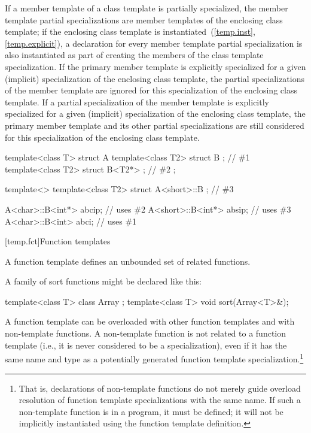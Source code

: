 \pnum
If a member template of a class template is partially specialized,
the member template partial specializations are member templates of
the enclosing class template;
if the enclosing class template is instantiated~(\ref{temp.inst}, \ref{temp.explicit}),
a declaration for every member template partial specialization is also
instantiated as part of creating the members of the class template
specialization.
If the primary member template is explicitly specialized for a given
(implicit) specialization of the enclosing class template,
the partial specializations of the member template are ignored for this
specialization of the enclosing class template.
If a partial specialization of the member template is explicitly specialized
for a given (implicit) specialization of the enclosing class template,
the primary member template and its other partial specializations are
still considered for this specialization of the enclosing class template.
\begin{example}
\begin{codeblock}
template<class T> struct A {
  template<class T2> struct B {};                               // \#1
  template<class T2> struct B<T2*> {};                          // \#2
};

template<> template<class T2> struct A<short>::B {};            // \#3

A<char>::B<int*>  abcip;                                        // uses \#2
A<short>::B<int*> absip;                                        // uses \#3
A<char>::B<int>  abci;                                          // uses \#1
\end{codeblock}
\end{example}

[temp.fct]{Function templates}

\pnum
A function template defines an unbounded set of related functions.
\begin{example}
A family of sort functions might be declared like this:

\begin{codeblock}
template<class T> class Array { };
template<class T> void sort(Array<T>&);
\end{codeblock}
\end{example}

\pnum
A function template can be overloaded with other function templates
and with non-template functions.
A non-template function is not
related to a function template
(i.e., it is never considered to be a specialization),
even if it has the same name and type
as a potentially generated function template specialization.\footnote{That is,
declarations of non-template functions do not merely guide
overload resolution of
function template specializations
with the same name.
If such a non-template function is  in a program, it must be defined;
it will not be implicitly instantiated using the function template definition.}

